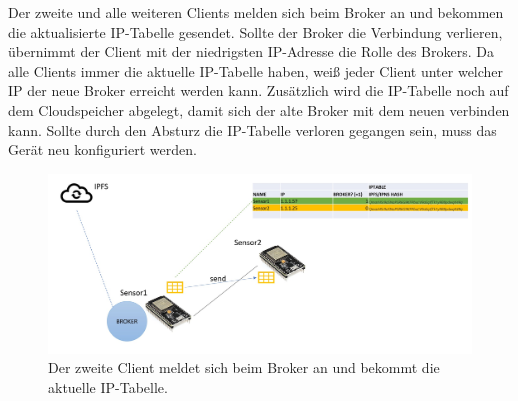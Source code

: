 \documentclass{article}
\begin{document}
Der zweite und alle weiteren Clients melden sich beim Broker an und bekommen die aktualisierte IP-Tabelle gesendet. Sollte der Broker die Verbindung verlieren, übernimmt der Client mit der niedrigsten IP-Adresse die Rolle des Brokers. Da alle Clients immer die aktuelle IP-Tabelle haben, weiß jeder Client unter welcher IP der neue Broker erreicht werden kann. Zusätzlich wird die IP-Tabelle noch auf dem Cloudspeicher abgelegt, damit sich der alte Broker mit dem neuen verbinden kann. Sollte durch den Absturz die IP-Tabelle verloren gegangen sein, muss das Gerät neu konfiguriert werden.

\begin{figure}[h]
    \centering
    \includegraphics[width=1\linewidth]{Porposal/Bilder/bild2.jpg}
    \caption{Der zweite Client meldet sich beim Broker an und bekommt die aktuelle IP-Tabelle.}
    \label{fig:statemachine}
\end{figure}
\end{document}
